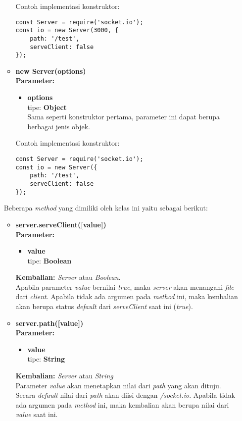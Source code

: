 \begin{enumerate}
\begin{itemize}
	Contoh implementasi konstruktor: 
\begin{lstlisting}
const Server = require('socket.io');
const io = new Server(3000, {
	path: '/test',
	serveClient: false
});
\end{lstlisting}
	
	\item \textbf{new Server(options)} \\ 
	\textbf{Parameter:}
	
		\begin{itemize}
			\item \textbf{options} \\ tipe: \textbf{Object} \\ Sama seperti konstruktor pertama, parameter ini dapat berupa berbagai jenis objek.
		\end{itemize}
	
	Contoh implementasi konstruktor:
	
\begin{lstlisting}
const Server = require('socket.io');
const io = new Server({
	path: '/test',
	serveClient: false
});
\end{lstlisting}
	
	\end{itemize}

	Beberapa \textit{method} yang dimiliki oleh kelas ini yaitu sebagai berikut: 
	
		\begin{itemize}
			\item \textbf{server.serveClient([value])} \\ 
			\textbf{Parameter:}
			\begin{itemize}
				\item \textbf{value} \\ tipe: \textbf{Boolean}
			\end{itemize}
			\textbf{Kembalian:} \textit{Server} atau \textit{Boolean}. \\
			Apabila parameter \textit{value} bernilai \textit{true}, maka \textit{server} akan menangani \textit{file} dari \textit{client}. Apabila tidak ada argumen pada \textit{method} ini, maka kembalian akan berupa status \textit{default} dari \textit{serveClient} saat ini (\textit{true}).
			
			\item \textbf{server.path([value])} \\
			\textbf{Parameter:}
			\begin{itemize}
				\item \textbf{value} \\ tipe: \textbf{String}
			\end{itemize}
			\textbf{Kembalian:} \textit{Server} atau \textit{String} \\
			Parameter \textit{value} akan menetapkan nilai dari \textit{path} yang akan dituju. Secara \textit{default} nilai dari \textit{path} akan diisi dengan \textit{/socket.io}. Apabila tidak ada argumen pada \textit{method} ini, maka kembalian akan berupa nilai dari \textit{value} saat ini.
			

\end{itemize}
\end{enumerate}
